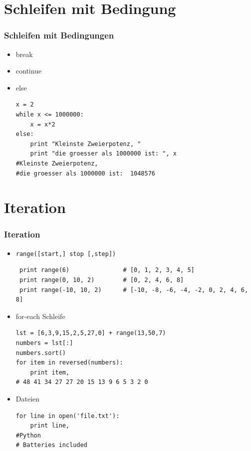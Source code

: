 \documentclass[10pt]{beamer}
\begin{document}
\section{Schleifen mit Bedingung}
 \begin{frame}[fragile]
  \frametitle{Schleifen mit Bedingungen}
   \begin{itemize}
    \item break
    \item continue
    \item else
     \begin{lstlisting}
x = 2
while x <= 1000000:
    x = x*2
else:
    print "Kleinste Zweierpotenz, "
    print "die groesser als 1000000 ist: ", x
#Kleinste Zweierpotenz,
#die groesser als 1000000 ist:  1048576  
     \end{lstlisting}

   \end{itemize}
\end{frame}

\section{Iteration}
\begin{frame}[fragile]
  \frametitle{Iteration}

   \begin{itemize}
     \item \texttt{range([start,] stop [,step])}
      \begin{lstlisting}
 print range(6)               # [0, 1, 2, 3, 4, 5]
 print range(0, 10, 2)        # [0, 2, 4, 6, 8]
 print range(-10, 10, 2)      # [-10, -8, -6, -4, -2, 0, 2, 4, 6, 8]
       \end{lstlisting}
     \item for-each Schleife
      \begin{lstlisting}
lst = [6,3,9,15,2,5,27,0] + range(13,50,7)
numbers = lst[:]
numbers.sort()
for item in reversed(numbers):
    print item,
# 48 41 34 27 27 20 15 13 9 6 5 3 2 0  
      \end{lstlisting}
     \item Dateien
      \begin{lstlisting}
for line in open('file.txt'):
    print line,
#Python
# Batteries included  
      \end{lstlisting}
   \end{itemize}
\end{frame}
\end{document}
